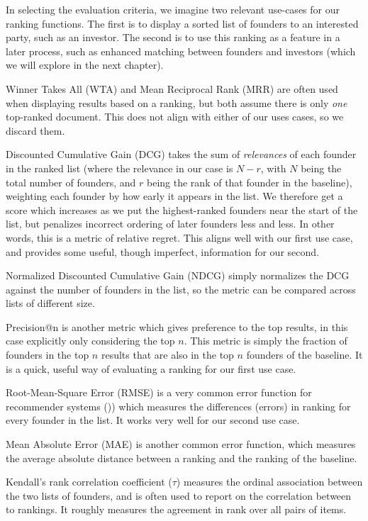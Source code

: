 In selecting the evaluation criteria, we imagine two relevant use-cases for our ranking functions. The first is to display a sorted list of founders to an interested party, such as an investor. The second is to use this ranking as a feature in a later process, such as enhanced matching between founders and investors (which we will explore in the next chapter).

Winner Takes All (WTA) and Mean Reciprocal Rank (MRR) are often used when displaying results based on a ranking, but both assume there is only \textit{one} top-ranked document. This does not align with either of our uses cases, so we discard them.

Discounted Cumulative Gain (DCG) takes the sum of \textit{relevances} of each founder in the ranked list (where the relevance in our case is $N - r$, with $N$ being the total number of founders, and $r$ being the rank of that founder in the baseline), weighting each founder by how early it appears in the list. We therefore get a score which increases as we put the highest-ranked founders near the start of the list, but penalizes incorrect ordering of later founders less and less. In other words, this is a metric of relative regret. This aligns well with our first use case, and provides some useful, though imperfect, information for our second.

Normalized Discounted Cumulative Gain (NDCG) simply normalizes the DCG against the number of founders in the list, so the metric can be compared across lists of different size.

Precision@n is another metric which gives preference to the top results, in this case explicitly only considering the top $n$. This metric is simply the fraction of founders in the top $n$ results that are also in the top $n$ founders of the baseline. It is a quick, useful way of evaluating a ranking for our first use case.

Root-Mean-Square Error (RMSE) is a very common error function for recommender systems (\cite{Cremonesi:2010:PRA:1864708.1864721})) which measures the differences (errors) in ranking for every founder in the list. It works very well for our second use case.

Mean Absolute Error (MAE) is another common error function, which measures the average absolute distance between a ranking and the ranking of the baseline.

Kendall's rank correlation coefficient ($\tau$) measures the ordinal association between the two lists of founders, and is often used to report on the correlation between to rankings. It roughly measures the agreement in rank over all pairs of items.

